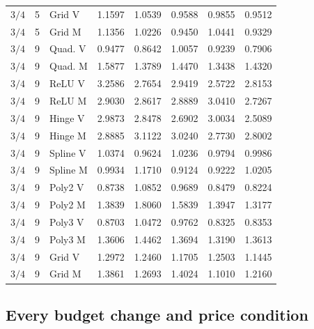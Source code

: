 \begin{longtable}{rrlrrrrr}
$3/4$ & 5 & Grid V & 1.1597 & 1.0539 & 0.9588 & 0.9855 & 0.9512\\
$3/4$ & 5 & Grid M & 1.1356 & 1.0226 & 0.9450 & 1.0441 & 0.9329\\
$3/4$ & 9 & Quad. V & 0.9477 & 0.8642 & 1.0057 & 0.9239 & 0.7906\\
$3/4$ & 9 & Quad. M & 1.5877 & 1.3789 & 1.4470 & 1.3438 & 1.4320\\
$3/4$ & 9 & ReLU V & 3.2586 & 2.7654 & 2.9419 & 2.5722 & 2.8153\\
$3/4$ & 9 & ReLU M & 2.9030 & 2.8617 & 2.8889 & 3.0410 & 2.7267\\
$3/4$ & 9 & Hinge V & 2.9873 & 2.8478 & 2.6902 & 3.0034 & 2.5089\\
$3/4$ & 9 & Hinge M & 2.8885 & 3.1122 & 3.0240 & 2.7730 & 2.8002\\
$3/4$ & 9 & Spline V & 1.0374 & 0.9624 & 1.0236 & 0.9794 & 0.9986\\
$3/4$ & 9 & Spline M & 0.9934 & 1.1710 & 0.9124 & 0.9222 & 1.0205\\
$3/4$ & 9 & Poly2 V & 0.8738 & 1.0852 & 0.9689 & 0.8479 & 0.8224\\
$3/4$ & 9 & Poly2 M & 1.3839 & 1.8060 & 1.5839 & 1.3947 & 1.3177\\
$3/4$ & 9 & Poly3 V & 0.8703 & 1.0472 & 0.9762 & 0.8325 & 0.8353\\
$3/4$ & 9 & Poly3 M & 1.3606 & 1.4462 & 1.3694 & 1.3190 & 1.3613\\
$3/4$ & 9 & Grid V & 1.2972 & 1.2460 & 1.1705 & 1.2503 & 1.1445\\
$3/4$ & 9 & Grid M & 1.3861 & 1.2693 & 1.4024 & 1.1010 & 1.2160\\
\end{longtable}
\endgroup


\subsection{Every budget change and price condition}

